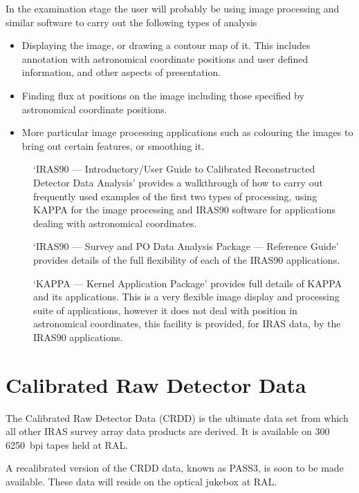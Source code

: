 \documentclass[11pt,nolof,noabs]{starlink}
\begin{document}
In the examination stage the user will probably be using image processing and
similar software to carry out the following types of analysis
\begin{itemize}
\item Displaying the image, or drawing a contour map of it. This includes
annotation with astronomical coordinate positions and user defined information,
and other aspects of presentation.
\item Finding flux at positions on the image including those specified by
astronomical coordinate positions.
\item More particular image processing applications such as colouring the images
to bring out certain features, or smoothing it.
\end{itemize}
\begin{description}
\item [] `IRAS90 --- Introductory/User Guide to Calibrated Reconstructed
Detector Data Analysis' provides a walkthrough of how to carry out
frequently used examples of the first two types of processing, using KAPPA
for the image processing and IRAS90 software for applications dealing
with astronomical coordinates.
\item [] `IRAS90 --- Survey and PO Data Analysis Package --- Reference
Guide' provides details of the full flexibility of each of the IRAS90
applications.
\item [] `KAPPA --- Kernel Application Package' provides full details of
KAPPA and its applications. This is a very flexible image display and processing
suite of applications, however it does not deal with position in astronomical
coordinates, this facility is provided, for IRAS data, by the IRAS90
applications.
\end{description}

\section{Calibrated Raw Detector Data}
The Calibrated Raw Detector Data (CRDD) is the ultimate data set from which all
other IRAS survey array data products are derived.
It is available on 300 6250~bpi tapes held at RAL.

A recalibrated version of the CRDD data, known as PASS3, is soon to be made
available. These data will reside on the optical jukebox at RAL.
\end{document}
